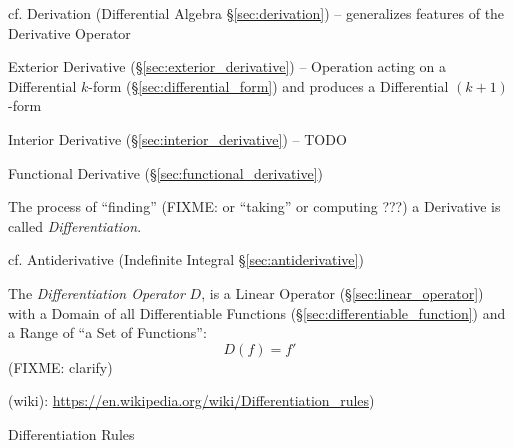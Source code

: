 {\fist cf. Derivation (Differential Algebra \S\ref{sec:derivation}) --
generalizes features of the Derivative Operator

\fist Exterior Derivative (\S\ref{sec:exterior_derivative}) -- Operation acting
on a Differential $k$-form (\S\ref{sec:differential_form}) and produces a
Differential $(k+1)$-form

\fist Interior Derivative (\S\ref{sec:interior_derivative}) -- TODO

\fist Functional Derivative (\S\ref{sec:functional_derivative})

The process of ``finding'' (FIXME: or ``taking'' or computing ???) a Derivative
is called \emph{Differentiation}.

\fist cf. Antiderivative (Indefinite Integral \S\ref{sec:antiderivative})

The \emph{Differentiation Operator} $D$, is a Linear Operator
(\S\ref{sec:linear_operator}) with a Domain of all Differentiable Functions
(\S\ref{sec:differentiable_function}) and a Range of ``a Set of Functions'':
\[
  D(f) = f'
\]
(FIXME: clarify)

(wiki): \url{https://en.wikipedia.org/wiki/Differentiation_rules})

Differentiation Rules

}
